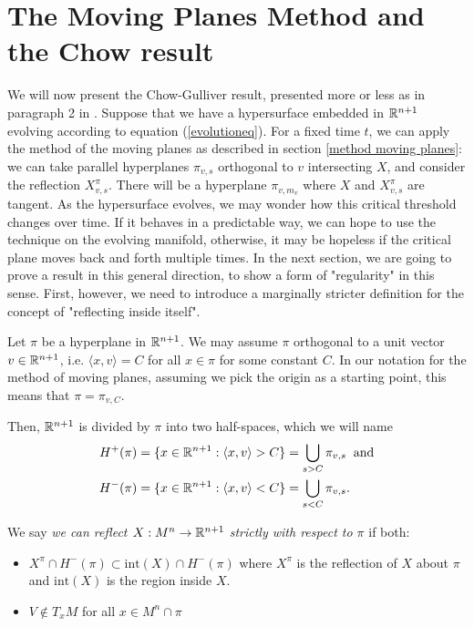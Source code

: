 \section{The Moving Planes Method and the Chow result}

We will now present the Chow-Gulliver result, presented more or less as in paragraph 2 in \cite{Chow}.
Suppose that we have a hypersurface embedded in $\mathbb{R}^{n+1}$ evolving according to equation (\ref{evolutioneq}). For a fixed time $t$, we can apply the method of the moving planes as described in section \ref{method moving planes}: we can take parallel hyperplanes $\pi_{v,s}$ orthogonal to $v$ intersecting $X$, and consider the reflection  $X_{v,s}^\pi$. There will be a hyperplane $\pi_{v,m_v}$ where $X$ and $X_{v,s}^\pi$ are tangent. As the hypersurface evolves, we may wonder how this critical threshold changes over time. If it behaves in a predictable way, we can hope to use the technique on the evolving manifold, otherwise, it may be hopeless if the critical plane moves back and forth multiple times. In the next section, we are going to prove a result in this general direction, to show a form of "regularity" in this sense. First, however, we need to introduce a marginally stricter definition for the concept of "reflecting inside itself". 



Let $\pi$ be a hyperplane in $\mathbb{R}^{n+1}$. We may assume $\pi$ orthogonal to a unit vector $v\in\mathbb{R}^{n+1}$, i.e. $\langle x, v\rangle= C$ for all $x\in \pi$ for some constant $C$. In our notation for the method of moving planes, assuming we pick the origin as a starting point, this means that $\pi = \pi_{v, C}$. 

Then, $\mathbb{R}^{n+1}$ is divided by $\pi$ into two half-spaces, which we will name 
\begin{align*}
H^+(\pi)&=\{x \in \mathbb{R}^{n+1} : \langle x, v\rangle > C\}= \bigcup_{s>C} \pi_{v, s} \;\;\mathrm{and}\\
H^-(\pi)&=\{x \in \mathbb{R}^{n+1} : \langle x, v\rangle < C\}= \bigcup_{s<C} \pi_{v, s}.
\end{align*} 

\begin{defin}
	We say {\em we can reflect $X: M^n\rightarrow \mathbb{R}^{n+1}$ strictly with respect to $\pi$} if both:
	\begin{itemize}
		\item $X^\pi\cap H^-(\pi)\subset \mathrm{int}(X)\cap H^-(\pi)$ where $X^\pi$ is the reflection of $X$ about $\pi$ and $\mathrm{int}(X)$ is the region inside $X$.
		\item $V\notin T_xM$ for all $x\in M^n \cap\pi$
	\end{itemize} 
\end{defin}


